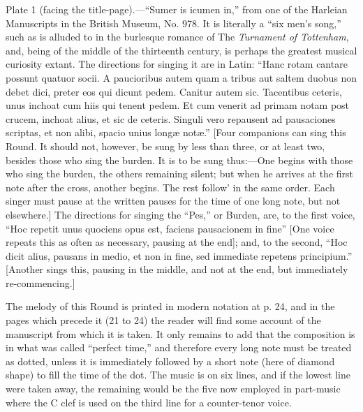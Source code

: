 


\thispagestyle{empty}

\quad Plate 1 (facing the title-page).—“Sumer is icumen in,” from one of the Harleian 
Manuscripts in the British Museum, No. 978. It is literally a “six men’s song,”
such as is alluded to in the burlesque romance of The \textit{Turnament of Tottenham},
and, being of the middle of the thirteenth century, is perhaps the greatest musical
curiosity extant. The directions for singing it are in Latin: “Hanc rotam cantare
possunt quatuor socii. A paucioribus autem quam a tribus aut saltem duobus non
debet dici, preter eos qui dicunt pedem. Canitur autem sic. Tacentibus ceteris, unus
inchoat cum hiis qui tenent pedem. Et cum venerit ad primam notam post crucem,
inchoat alius, et sic de ceteris. Singuli vero repausent ad pausaciones scriptas, et non
alibi, spacio unius longæ notæ.” [Four companions can sing this Round. It should
not, however, be sung by less than three, or at least two, besides those who sing the
burden. It is to be sung thus:—One begins with those who sing the burden, the
others remaining silent; but when he arrives at the first note after the cross, another
begins. The rest follow' in the same order. Each singer must pause at the written
pauses for the time of one long note, but not elsewhere.] The directions for singing
the “Pes,” or Burden, are, to the first voice, “Hoc repetit unus quociens opus est,
faciens pausacionem in fine” [One voice repeats this as often as necessary, pausing at
the end]; and, to the second, “Hoc dicit alius, pausans in medio, et non in fine, sed
immediate repetens principium.” [Another sings this, pausing in the middle, and
not at the end, but immediately re-commencing.]

The melody of this Round is printed in modern notation at p. 24, and in the pages
which precede it (21 to 24) the reader will find some account of the manuscript from
which it is taken. It only remains to add that the composition is in what was called
“perfect time,” and therefore every long note must be treated as dotted, unless it is
immediately followed by a short note (here of diamond shape) to fill the time of the
dot. The music is on six lines, and if the lowest line were taken away, the remaining
would be the five now employed in part-music where the C clef is used on the third
line for a counter-tenor voice.

